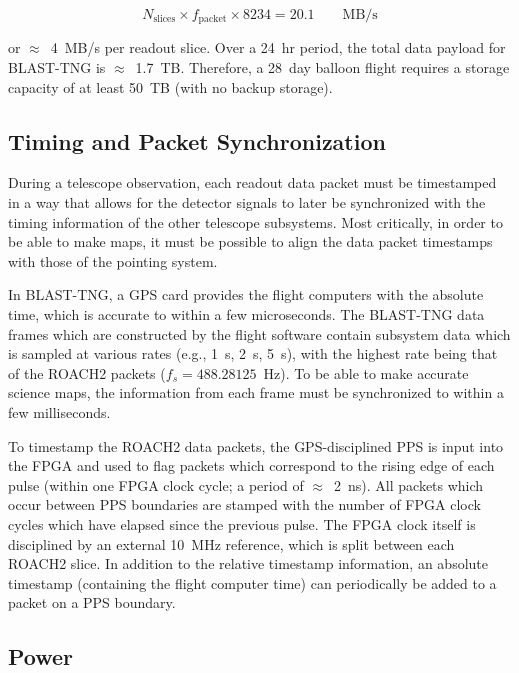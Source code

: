 \begin{equation}\label{eq:data rate}
  N_{\mathrm{slices}} \times f_{\mathrm{packet}} \times 8234 =  20.1 \qquad \mathrm{MB/s}
\end{equation}

or $\approx$~4~MB/s per readout slice. Over a 24~hr period, the total data payload for BLAST-TNG is $\approx$~1.7~TB. Therefore, a 28~day balloon flight requires a storage capacity of at least 50~TB (with no backup storage).

\subsection{Timing and Packet Synchronization}\label{timing}

During a telescope observation, each readout data packet must be timestamped in a way that allows for the detector signals to later be synchronized with the timing information of the other telescope subsystems. Most critically, in order to be able to make maps, it must be possible to align the data packet timestamps with those of the pointing system.

In BLAST-TNG, a GPS card provides the flight computers with the absolute time, which is accurate to within a few microseconds. The BLAST-TNG data frames which are constructed by the flight software contain subsystem data which is sampled at various rates (e.g., 1~s, 2~s, 5~s), with the highest rate being that of the ROACH2 packets ($f_{s} = 488.28125$~Hz). To be able to make accurate science maps, the information from each frame must be synchronized to within a few milliseconds.

To timestamp the ROACH2 data packets, the GPS-disciplined PPS is input into the FPGA and used to flag packets which correspond to the rising edge of each pulse (within one FPGA clock cycle; a period of $\approx$~2~ns). All packets which occur between PPS boundaries are stamped with the number of FPGA clock cycles which have elapsed since the previous pulse. The FPGA clock itself is disciplined by an external 10~MHz reference, which is split between each ROACH2 slice. In addition to the relative timestamp information, an absolute timestamp (containing the flight computer time) can periodically be added to a packet on a PPS boundary.

\subsection{Power}\label{power}


